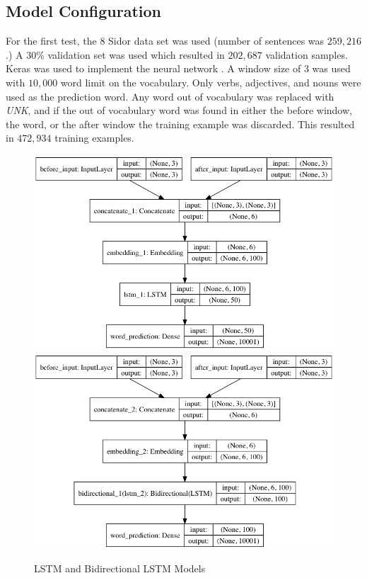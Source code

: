 \documentclass[11pt,a4paper]{article}
\begin{document}
\subsection{Model Configuration} \label{sec:model_config}
For the first test, the 8 Sidor data set was used (number of sentences was  $259,216$.)
A 30\% validation set was used which resulted in $202,687$ validation samples.
Keras was used to implement the neural network \cite{keras}.
A window size of 3 was used with $10,000$ word limit on the vocabulary.
Only verbs, adjectives, and nouns were used as the prediction word.
Any word out of vocabulary was replaced with \textit{UNK}, and if the out of vocabulary word was found in either the before window, the word, or the after window the training example was discarded.
This resulted in $472,934$ training examples.

\begin{figure}[h!]
\centering
\includegraphics[scale=0.3]{atta_sample_lstm.png}
\includegraphics[scale=0.3]{atta_sample_blstm.png}
\caption{LSTM and Bidirectional LSTM Models}
\label{fig:compare_lstm}
\end{figure}
\end{document}
